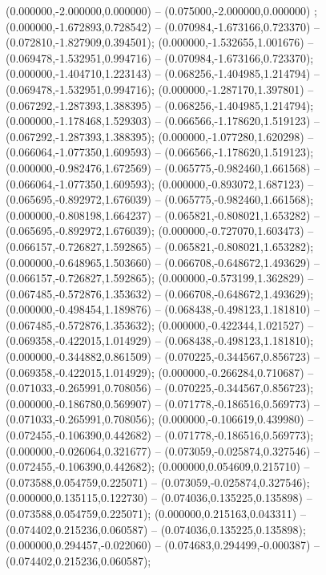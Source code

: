  (0.000000,-2.000000,0.000000) -- (0.075000,-2.000000,0.000000) ;
 (0.000000,-1.672893,0.728542) -- (0.070984,-1.673166,0.723370) -- (0.072810,-1.827909,0.394501);
 (0.000000,-1.532655,1.001676) -- (0.069478,-1.532951,0.994716) -- (0.070984,-1.673166,0.723370);
 (0.000000,-1.404710,1.223143) -- (0.068256,-1.404985,1.214794) -- (0.069478,-1.532951,0.994716);
 (0.000000,-1.287170,1.397801) -- (0.067292,-1.287393,1.388395) -- (0.068256,-1.404985,1.214794);
 (0.000000,-1.178468,1.529303) -- (0.066566,-1.178620,1.519123) -- (0.067292,-1.287393,1.388395);
 (0.000000,-1.077280,1.620298) -- (0.066064,-1.077350,1.609593) -- (0.066566,-1.178620,1.519123);
 (0.000000,-0.982476,1.672569) -- (0.065775,-0.982460,1.661568) -- (0.066064,-1.077350,1.609593);
 (0.000000,-0.893072,1.687123) -- (0.065695,-0.892972,1.676039) -- (0.065775,-0.982460,1.661568);
 (0.000000,-0.808198,1.664237) -- (0.065821,-0.808021,1.653282) -- (0.065695,-0.892972,1.676039);
 (0.000000,-0.727070,1.603473) -- (0.066157,-0.726827,1.592865) -- (0.065821,-0.808021,1.653282);
 (0.000000,-0.648965,1.503660) -- (0.066708,-0.648672,1.493629) -- (0.066157,-0.726827,1.592865);
 (0.000000,-0.573199,1.362829) -- (0.067485,-0.572876,1.353632) -- (0.066708,-0.648672,1.493629);
 (0.000000,-0.498454,1.189876) -- (0.068438,-0.498123,1.181810) -- (0.067485,-0.572876,1.353632);
 (0.000000,-0.422344,1.021527) -- (0.069358,-0.422015,1.014929) -- (0.068438,-0.498123,1.181810);
 (0.000000,-0.344882,0.861509) -- (0.070225,-0.344567,0.856723) -- (0.069358,-0.422015,1.014929);
 (0.000000,-0.266284,0.710687) -- (0.071033,-0.265991,0.708056) -- (0.070225,-0.344567,0.856723);
 (0.000000,-0.186780,0.569907) -- (0.071778,-0.186516,0.569773) -- (0.071033,-0.265991,0.708056);
 (0.000000,-0.106619,0.439980) -- (0.072455,-0.106390,0.442682) -- (0.071778,-0.186516,0.569773);
 (0.000000,-0.026064,0.321677) -- (0.073059,-0.025874,0.327546) -- (0.072455,-0.106390,0.442682);
 (0.000000,0.054609,0.215710) -- (0.073588,0.054759,0.225071) -- (0.073059,-0.025874,0.327546);
 (0.000000,0.135115,0.122730) -- (0.074036,0.135225,0.135898) -- (0.073588,0.054759,0.225071);
 (0.000000,0.215163,0.043311) -- (0.074402,0.215236,0.060587) -- (0.074036,0.135225,0.135898);
 (0.000000,0.294457,-0.022060) -- (0.074683,0.294499,-0.000387) -- (0.074402,0.215236,0.060587);
